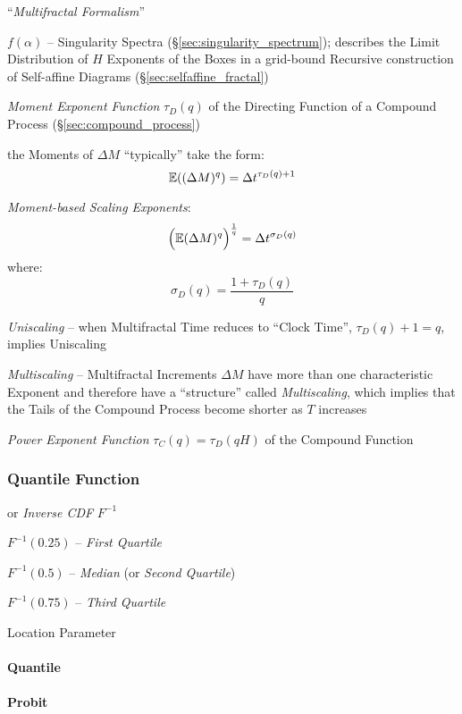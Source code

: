 ``\emph{Multifractal Formalism}''

$f(\alpha)$ -- Singularity Spectra (\S\ref{sec:singularity_spectrum}); describes
the Limit Distribution of $H$ Exponents of the Boxes in a grid-bound Recursive
construction of Self-affine Diagrams (\S\ref{sec:selfaffine_fractal})

\emph{Moment Exponent Function} $\tau_D(q)$ of the Directing Function of a
Compound Process (\S\ref{sec:compound_process})

the Moments of $\Delta M$ ``typically'' take the form:
\[
  \mathbb{E}((\Delta M)^q) = \Delta t^{\tau_D(q) + 1}
\]

\emph{Moment-based Scaling Exponents}:
\[
  \Big(\mathbb{E}(\Delta M)^q\Big)^\frac{1}{q} = \Delta t^{\sigma_D(q)}
\]
where:
\[
  \sigma_D(q) = \frac{1 + \tau_D(q)}{q}
\]

\emph{Uniscaling} -- when Multifractal Time reduces to ``Clock Time'',
$\tau_D(q) + 1 = q$, implies Uniscaling

\emph{Multiscaling} -- Multifractal Increments $\Delta M$ have more than one
characteristic Exponent and therefore have a ``structure'' called
\emph{Multiscaling}, which implies that the Tails of the Compound Process become
shorter as $T$ increases

\emph{Power Exponent Function} $\tau_C(q) = \tau_D(qH)$ of the Compound Function



\subsubsection{Quantile Function}\label{sec:quantile_function}

or \emph{Inverse CDF} $F^{-1}$

$F^{-1}(0.25)$ -- \emph{First Quartile}

$F^{-1}(0.5)$ -- \emph{Median} (or \emph{Second Quartile})

$F^{-1}(0.75)$ -- \emph{Third Quartile}

Location Parameter



\paragraph{Quantile}\label{sec:quantile}\hfill

\paragraph{Probit}\label{sec:probit}\hfill

